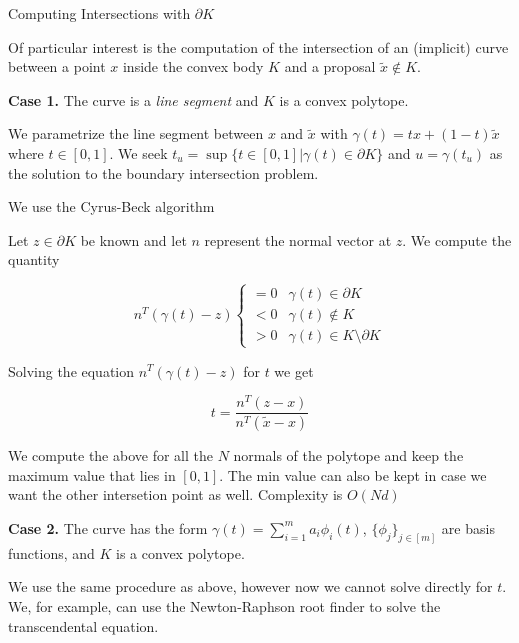 \documentclass{beamer}
\begin{document}
\begin{frame}[allowframebreaks]{Computing Intersections with $\partial K$}
    
    
    Of particular interest is the computation of the intersection of an (implicit) curve between a point $x$ inside the convex body $K$ and a proposal $\tilde x \not \in K$. 
    
    \medskip

    \textbf{Case 1.} The curve is a \emph{line segment} and $K$ is a convex polytope.

    We parametrize the line segment between $x$ and $\tilde x$ with $\gamma(t) = t x + (1 - t) \tilde x$ where $t \in [0, 1]$. We seek $t_u = \sup \{ t \in [0, 1] | \gamma(t) \in \partial K \}$ and $u = \gamma(t_u)$ as the solution to the boundary intersection problem. 
    
    \medskip
    
    We use the Cyrus-Beck  \cite{cyrus1978generalized} algorithm
    
    \framebreak
    
    Let $z \in \partial K$ be known and let $n$ represent the normal vector at $z$. We compute the quantity 
    
    \begin{equation*}
        n^T (\gamma(t) - z) \begin{cases} = 0 & \gamma(t) \in \partial K \\
        < 0 & \gamma(t) \notin K \\
        > 0 & \gamma(t) \in K \setminus \partial K
        \end{cases}
    \end{equation*}

    Solving the equation $n^T (\gamma(t) - z)$ for $t$ we get 
    
    $$t = \frac {n^T (z - x)} {n^T (\tilde x - x)}$$

    We compute the above for all the $N$ normals of the polytope and keep the maximum value that lies in $[0, 1]$. The min value can also be kept in case we want the other intersetion point as well. Complexity is $O(Nd)$
    
    \framebreak
    
    \textbf{Case 2.} The curve has the form $\gamma(t) = \sum_{i = 1}^m a_i \phi_i(t)$, $\{ \phi_j \}_{j \in [m]}$ are basis functions, and $K$ is a convex polytope.
    
    \medskip
    
    We use the same procedure as above, however now we cannot solve directly for $t$. We, for example, can use the Newton-Raphson root finder to solve the transcendental equation.
    

\end{frame}
\end{document}
